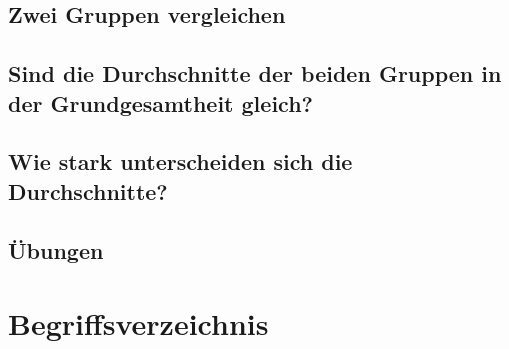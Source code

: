 \documentclass[
]{book}
\theoremstyle{definition}
\theoremstyle{definition}
\theoremstyle{definition}
\theoremstyle{definition}
\theoremstyle{remark}
\begin{document}
\section{Zwei Gruppen vergleichen}\label{zwei-gruppen-vergleichen}

\section{Sind die Durchschnitte der beiden Gruppen in der Grundgesamtheit gleich?}\label{sind-die-durchschnitte-der-beiden-gruppen-in-der-grundgesamtheit-gleich}

\section{Wie stark unterscheiden sich die Durchschnitte?}\label{wie-stark-unterscheiden-sich-die-durchschnitte}

\section{Übungen}\label{uxfcbungen-4}

\chapter*{Begriffsverzeichnis}\label{begriffsverzeichnis}
\end{document}
